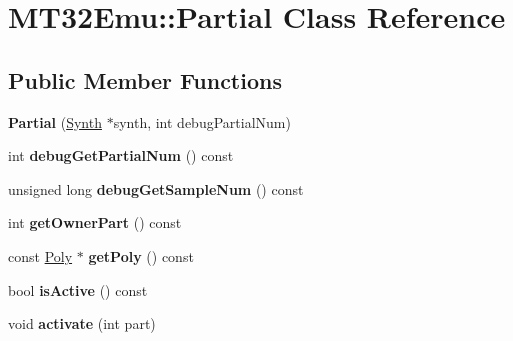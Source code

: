 \hypertarget{classMT32Emu_1_1Partial}{\section{M\-T32\-Emu\-:\-:Partial Class Reference}
\label{classMT32Emu_1_1Partial}
}
\subsection*{Public Member Functions}
\begin{DoxyCompactItemize}
\item 
\hypertarget{classMT32Emu_1_1Partial_a12f1691c299ffb87c4020ce4ea0db4ee}{{\bfseries Partial} (\hyperlink{classMT32Emu_1_1Synth}{Synth} $\ast$synth, int debug\-Partial\-Num)}\label{classMT32Emu_1_1Partial_a12f1691c299ffb87c4020ce4ea0db4ee}

\item 
\hypertarget{classMT32Emu_1_1Partial_a7410808cbcf8c65a1268703189640460}{int {\bfseries debug\-Get\-Partial\-Num} () const }\label{classMT32Emu_1_1Partial_a7410808cbcf8c65a1268703189640460}

\item 
\hypertarget{classMT32Emu_1_1Partial_a2a454c4d62e1979be362162ae53a4da3}{unsigned long {\bfseries debug\-Get\-Sample\-Num} () const }\label{classMT32Emu_1_1Partial_a2a454c4d62e1979be362162ae53a4da3}

\item 
\hypertarget{classMT32Emu_1_1Partial_a28ce4e6644a1f7640ff7ffc24af067c3}{int {\bfseries get\-Owner\-Part} () const }\label{classMT32Emu_1_1Partial_a28ce4e6644a1f7640ff7ffc24af067c3}

\item 
\hypertarget{classMT32Emu_1_1Partial_a4294bd6009907d251e7a6ef09f4b8058}{const \hyperlink{classMT32Emu_1_1Poly}{Poly} $\ast$ {\bfseries get\-Poly} () const }\label{classMT32Emu_1_1Partial_a4294bd6009907d251e7a6ef09f4b8058}

\item 
\hypertarget{classMT32Emu_1_1Partial_ac82540b14ea21f893c6d7ea3756aa0e1}{bool {\bfseries is\-Active} () const }\label{classMT32Emu_1_1Partial_ac82540b14ea21f893c6d7ea3756aa0e1}

\item 
\hypertarget{classMT32Emu_1_1Partial_a23ec51bcd762a298592dc81976fe7d6c}{void {\bfseries activate} (int part)}\label{classMT32Emu_1_1Partial_a23ec51bcd762a298592dc81976fe7d6c}


\end{DoxyCompactItemize}
